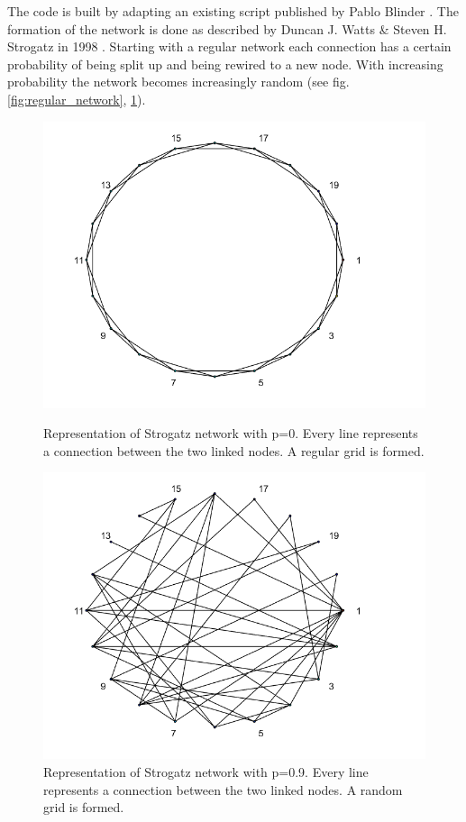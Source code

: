 \documentclass[11pt]{article}
\begin{document}
The code is built by adapting an existing script published by Pablo Blinder \cite{Network1}. The formation of the network is done as described by Duncan J. Watts \& Steven H. Strogatz in 1998 \cite{Network2}. Starting with a regular network each connection has a certain probability of being split up and being rewired to a new node. With increasing probability the network becomes increasingly random (see fig. \ref{fig:regular_network}, \ref{fig:random_network}).

\begin{figure}
	\begin{minipage}[c]{0.45\textwidth}
		\centering
		\includegraphics[width=\textwidth]{Graphs/p0.png}
		\caption{Representation of Strogatz network with p=0. Every line represents a connection between the two linked nodes. A regular grid is formed.}
		\label{fig:regular_network}
	\end{minipage}
	\hfill
		\begin{minipage}[c]{0.45\textwidth}
			\centering
			\includegraphics[width=\textwidth]{Graphs/p0_9.png}
			\caption{Representation of Strogatz network with p=0.9. Every line represents a connection between the two linked nodes. A random grid is formed.}
			\label{fig:random_network}
		\end{minipage}
\end{figure}
\end{document}
